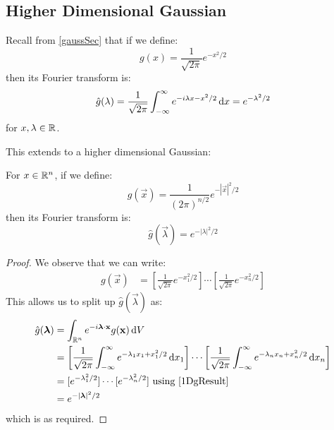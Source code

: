 \documentclass[../main.tex]{subfiles}
\begin{document}
\subsection{Higher Dimensional Gaussian}
\begin{remark}[Recap]
  Recall from \cref{gaussSec} that if we define:
  \[
    g(x) = \frac{1}{\sqrt{2\pi}} e^{-x^2/2}
  \]
  then its Fourier transform is:
  \begin{align}
    \hat{g}(\lambda) = \frac{1}{\sqrt{2\pi}} \int_{-\infty}^{\infty} e^{-i\lambda x - x^2/2} \d{x} = e^{-\lambda^2/2} \label{1DgResult}
  \end{align}
  for $x, \lambda \in \mathbb{R}$.
\end{remark}
This extends to a higher dimensional Gaussian:
\begin{proposition}
  For $x \in \mathbb{R}^{n}$, if we define: \label{higherGS}
  \[
    g(\vec{x}) = \frac{1}{(2\pi)^{n/2}} e^{-|\vec{x}|^2/2}
  \]
  then its Fourier transform is:
  \[
    \hat{g}(\vec{\lambda}) = e^{-|\lambda|^2/2}
  \]
\end{proposition}
\begin{proof}
  We observe that we can write:
  \begin{align*}
    g(\vec{x}) &= \left[\frac{1}{\sqrt{2\pi}}e^{-x^2_1/2}\right] \cdots \left[\frac{1}{\sqrt{2\pi}}e^{-x^2_n/2}\right]
  \end{align*}
  This allows us to split up $\hat{g}(\vec{\lambda})$ as:
  \begin{align*}
    \hat{g}(\vec{\lambda}) &= \int_{\R^{n}} e^{-i \vec{\lambda} \cdot \vec{x}} g(\vec{x}) \d{V} \\
                           &= \left[\frac{1}{\sqrt{2\pi}}\int_{-\infty}^{\infty} e^{- \lambda_1 x_1 + x^2_1/2} \d{x_1}\right] \cdots \left[\frac{1}{\sqrt{2\pi}}\int_{-\infty}^{\infty} e^{- \lambda_n x_n + x^2_n/2} \d{x_n}\right] \\
                           &= [e^{-\lambda^2_1/2}] \cdots [e^{-\lambda^2_n/2}] \text{ using \cref{1DgResult}} \\
                           &= e^{-|\vec{\lambda}|^2/2}
  \end{align*}
  which is as required.
\end{proof}
\end{document}
